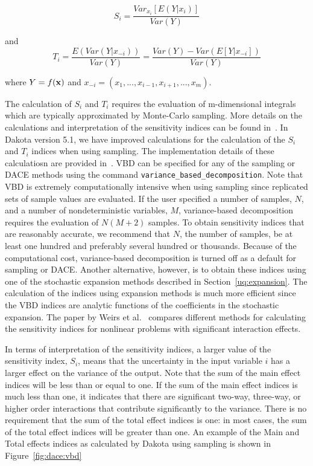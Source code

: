 \begin{equation}
S_{i}=\frac{Var_{x_{i}}[E(Y|x_{i})]}{Var(Y)} \label{eq:VBD_Si}
\end{equation}

and 
\begin{equation}
T_{i}=\frac{E(Var(Y|x_{-i}))}{Var(Y)}=\frac{Var(Y)-Var(E[Y|x_{-i}])}{Var(Y)} \label{eq:VBD_Ti}
\end{equation}

where $Y=f({\bf x})$ and ${x_{-i}=(x_{1},...,x_{i-1},x_{i+1},...,x_{m})}$.

The calculation of $S_{i}$ and $T_{i}$ requires the evaluation of 
m-dimensional integrals which are typically approximated by Monte-Carlo 
sampling. More details on the
calculations and interpretation of the sensitivity indices can be
found in~\cite{Sal04}. In Dakota version 5.1, we have 
improved calculations for the calculation of the $S_{i}$ and $T_{i}$ 
indices when using sampling.  The implementation details of these 
calculatiosn are provided in~\cite{Weirs10}. 
VBD can be specified for any of the sampling or DACE methods using the 
command \texttt{variance\_based\_decomposition}.
Note that VBD is extremely computationally intensive when using sampling 
since replicated sets of sample values are evaluated. If the
user specified a number of samples, $N$, and a number of
nondeterministic variables, $M$, variance-based decomposition
requires the evaluation of $N(M+2)$ samples. To obtain
sensitivity indices that are reasonably accurate, we recommend that
$N$, the number of samples, be at least one hundred and
preferably several hundred or thousands. Because of the computational
cost, variance-based decomposition is turned off as a default
for sampling or DACE.  Another alternative, however, is to obtain 
these indices using one of the stochastic expansion methods 
described in Section~\ref{uq:expansion}. The calculation 
of the indices using expansion methods is much more efficient 
since the VBD indices are analytic functions of the coefficients 
in the stochastic expansion. The paper by Weirs et al.~\cite{Weirs10}
compares different methods for calculating the sensitivity 
indices for nonlinear problems with significant interaction effects.

In terms of interpretation of the sensitivity indices, a larger value of
the sensitivity index, $S_{i}$,
means that the uncertainty in the input variable $i$ has a
larger effect on the variance of the output. Note that the 
sum of the main effect indices will be less than or equal to one. 
If the sum of the main effect indices is much less than one, 
it indicates that there are significant two-way, three-way, or higher
order interactions that contribute significantly to the variance. 
There is no requirement that the sum of the total effect indices 
is one:  in most cases, the sum of the total effect indices will be 
greater than one.  An example of the Main and Total effects 
indices as calculated by Dakota using sampling is shown 
in Figure~\ref{fig:dace:vbd}

